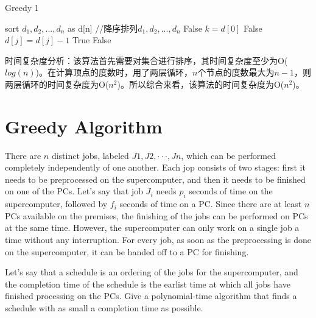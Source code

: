 \documentclass[12pt]{ctexart}
\begin{document}
\begin{algorithm}[h]
    \begin{algorithmic}[0] %
    \caption{Greedy 1}
    \State sort $d_1, d_2,...,d_n$ as d[n] //降序排列$d_1, d_2,...,d_n$
    \State \Return False
    \EndIf
    	\State $k = d[0]$
		\State \Return False
	\EndIf
    		\State $d[j] = d[j] - 1$
	\EndFor
    \EndFor
    \State \Return True
    \Else 
    \State \Return False
    \EndIf
    \end{algorithmic}
\end{algorithm}
\par 时间复杂度分析：该算法首先需要对集合进行排序，其时间复杂度至少为O($log(n)$)。在计算顶点的度数时，用了两层循环，$n$个节点的度数最大为$n-1$，则两层循环的时间复杂度为O($n^2$)。所以综合来看，该算法的时间复杂度为O($n^2$)。
\newpage
\section{Greedy Algorithm}
There are $n$ distinct jobs, labeled $J1, J2, · · · , Jn$, which can be performed completely independently of one another. Each jop consists of two stages: first it needs to be preprocessed on the supercomputer, and then it needs to be finished on one of the PCs. Let’s say that job $J_i$ needs $p_i$ seconds of time on the supercomputer, followed by $f_i$ seconds of time on a PC. Since there are at least $n$ PCs available on the premises, the finishing of the jobs can be performed on PCs at the same time. However, the supercomputer can only work on a single job a time without any interruption. For every job, as soon as the preprocessing is done on the supercomputer, it can be handed off to a PC for finishing.
\par Let’s say that a schedule is an ordering of the jobs for the supercomputer, and the completion time of the schedule is the earlist time at which all jobs have finished processing on the PCs. Give a polynomial-time algorithm that finds a schedule with as small a completion time as possible.
\end{document}

